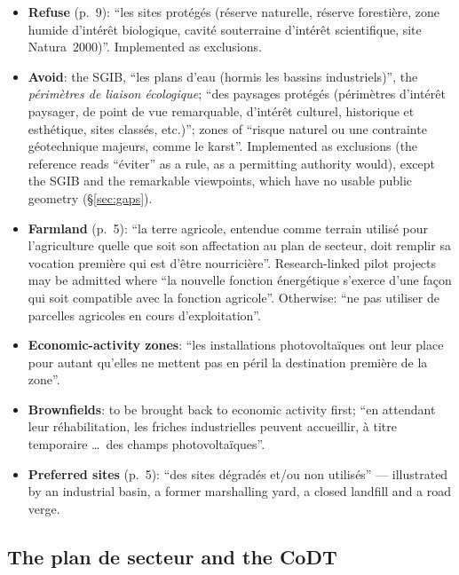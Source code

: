\documentclass[11pt,a4paper]{article}
\begin{document}
\begin{itemize}
\item \textbf{Refuse} (p.~9): ``les sites protégés (réserve naturelle, réserve
  forestière, zone humide d'intérêt biologique, cavité souterraine d'intérêt
  scientifique, site Natura~2000)''. Implemented as exclusions.
\item \textbf{Avoid}: the SGIB, ``les plans d'eau (hormis les bassins
  industriels)'', the \emph{périmètres de liaison écologique}; ``des paysages
  protégés (périmètres d'intérêt paysager, de point de vue remarquable,
  d'intérêt culturel, historique et esthétique, sites classés, etc.)''; zones of
  ``risque naturel ou une contrainte géotechnique majeurs, comme le karst''.
  Implemented as exclusions (the reference reads ``éviter'' as a rule, as a
  permitting authority would), except the SGIB and the remarkable viewpoints,
  which have no usable public geometry (\S{}\ref{sec:gaps}).
\item \textbf{Farmland} (p.~5): ``la terre agricole, entendue comme terrain
  utilisé pour l'agriculture quelle que soit son affectation au plan de
  secteur, doit remplir sa vocation première qui est d'être nourricière''.
  Research-linked pilot projects may be admitted where ``la nouvelle fonction
  énergétique s'exerce d'une façon qui soit compatible avec la fonction
  agricole''. Otherwise: ``ne pas utiliser de parcelles agricoles en cours
  d'exploitation''.
\item \textbf{Economic-activity zones}: ``les installations photovoltaïques ont
  leur place pour autant qu'elles ne mettent pas en péril la destination
  première de la zone''.
\item \textbf{Brownfields}: to be brought back to economic activity first;
  ``en attendant leur réhabilitation, les friches industrielles peuvent
  accueillir, à titre temporaire \ldots\ des champs photovoltaïques''.
\item \textbf{Preferred sites} (p.~5): ``des sites dégradés et/ou non utilisés''
  --- illustrated by an industrial basin, a former marshalling yard, a closed
  landfill and a road verge.
\end{itemize}

\subsection{The plan de secteur and the CoDT}
\end{document}
